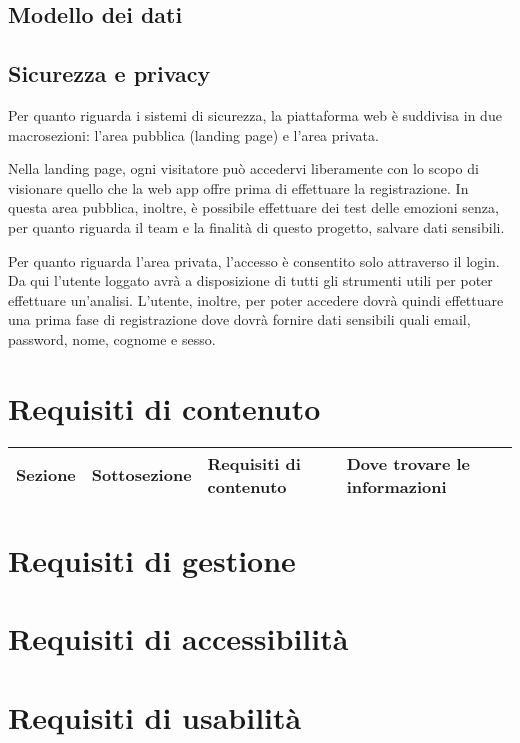 \subsection{Modello dei dati}

\subsection{Sicurezza e privacy}
Per quanto riguarda i sistemi di sicurezza, la piattaforma web è suddivisa in 
due macrosezioni: l'area pubblica (landing page) e l'area privata.

Nella landing page, ogni visitatore può accedervi liberamente con lo scopo di 
visionare quello che la web app offre prima di effettuare la registrazione. In 
questa area pubblica, inoltre, è possibile effettuare dei test delle emozioni 
senza, per quanto riguarda il team e la finalità di questo progetto, salvare 
dati sensibili.

Per quanto riguarda l'area privata, l'accesso è consentito solo attraverso il 
login. Da qui l'utente loggato avrà a disposizione di tutti gli strumenti utili 
per poter effettuare un'analisi. L'utente, inoltre, per poter accedere dovrà 
quindi effettuare una prima fase di registrazione dove dovrà fornire dati 
sensibili quali email, password, nome, cognome e sesso.

\section{Requisiti di contenuto}\label{sec:requisiti-di-contenuto}

\begin{table}[H]
	\centering
	\caption{I bisogni degli utenti di Emotionally.}
	\label{tab:bisogni-utenti}
	\begin{longtable}{@{}|>{\centering\arraybackslash}m{}|m{}|m{}|>{\centering\arraybackslash}m{}|@{}}
		\hline
		\rowcolor{emotionally-color}
		{\color{white} \textbf{Sezione}}   & {\color{white} 
		\textbf{Sottosezione}}     & {\color{white} \textbf{Requisiti di 
		contenuto}} & {\color{white} \textbf{Dove trovare le informazioni}} 
		\\\hline
		\endfirsthead
		\hline
	\end{longtable}
\end{table}
\section{Requisiti di gestione}\label{sec:requisiti-di-gestione}

\section{Requisiti di accessibilità}\label{sec:requisiti-di-accessibilita}

\section{Requisiti di usabilità}\label{sec:requisiti-di-usabilita}
